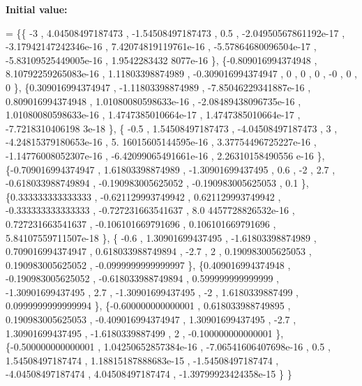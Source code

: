 {\bfseries Initial value\+:}
\begin{DoxyCode}
= \{\{               -3 ,  4.04508497187473 , -1.54508497187473 ,               0.5 , -2.04950567861192e-17 ,
       -3.17942147242346e-16 , 7.42074819119761e-16 , -5.57864680096504e-17 , -5.83109525449005e-16 , 1.9542283432
      8077e-16 \},
\{-0.809016994374948 , 8.10792259265083e-16 ,  1.11803398874989 , -0.309016994374947 ,                 0 ,  
                     0 ,                 0 ,                -0 ,                 0 ,                 0 \},
\{0.309016994374947 , -1.11803398874989 , -7.85046229341887e-16 , 0.809016994374948 , 1.01080080598633e-16 ,
       -2.08489438096735e-16 , 1.01080080598633e-16 , 1.4747385010664e-17 , 1.4747385010664e-17 , -7.7218310406198
      3e-18 \},
\{             -0.5 ,  1.54508497187473 , -4.04508497187473 ,                 3 , -4.24815379180653e-16 , 5.
      16015605144595e-16 , 3.37754496725227e-16 , -1.14776008052307e-16 , -6.42099065491661e-16 , 2.26310158490556
      e-16 \},
\{-0.709016994374947 ,  1.61803398874989 , -1.30901699437495 ,               0.6 ,                -2 ,      
               2.7 , -0.618033988749894 , -0.190983005625052 , -0.190983005625053 ,               0.1 \},
\{0.333333333333333 , -0.621129993749942 , 0.621129993749942 , -0.333333333333333 , -0.727231663541637 , 8.0
      4457728826532e-16 , 0.727231663541637 , -0.106101669791696 , 0.106101669791696 , 5.84107559711507e-18 \},
\{             -0.6 ,  1.30901699437495 , -1.61803398874989 , 0.709016994374947 , 0.618033988749894 ,       
             -2.7 ,                 2 , 0.190983005625053 , 0.190983005625052 , -0.0999999999999997 \},
\{0.409016994374948 , -0.190983005625052 , -0.618033988749894 , 0.599999999999999 , -1.30901699437495 ,     
                2.7 , -1.30901699437495 ,                -2 ,   1.6180339887499 , 0.0999999999999994 \},
\{-0.600000000000001 , 0.618033988749895 , 0.190983005625053 , -0.409016994374947 ,  1.30901699437495 ,     
               -2.7 ,  1.30901699437495 ,  -1.6180339887499 ,                 2 , -0.100000000000001 \},
\{-0.500000000000001 , 1.04250652857384e-16 , -7.06541606407698e-16 ,               0.5 ,  1.54508497187474 
      , 1.18815187888683e-15 , -1.54508497187474 , -4.04508497187474 ,  4.04508497187474 , -1.39799923424358e-15 \}
      \}
\end{DoxyCode}
\mbox{\label{a00512_ada19a548901d8b04fd5c62d0e30d53f7}} 

